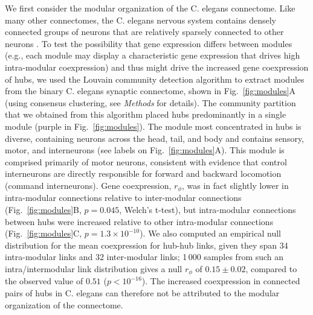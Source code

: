 \documentclass[10pt,letterpaper]{article}
\begin{document}
We first consider the modular organization of the C. elegans connectome.
Like many other connectomes, the C. elegans nervous system contains densely connected groups of neurons that are relatively sparsely connected to other neurons \cite{Kim2014, Bassett2010, Pavlovic2014}.
To test the possibility that gene expression differs between modules (e.g., each module may display a characteristic gene expression that drives high intra-modular coexpression) and thus might drive the increased gene coexpression of hubs, we used the Louvain community detection algorithm to extract modules from the binary C. elegans synaptic connectome, shown in Fig.~\ref{fig:modules}A (using consensus clustering, see \textit{Methods} for details).
The community partition that we obtained from this algorithm placed hubs predominantly in a single module (purple in Fig.~\ref{fig:modules}).
The module most concentrated in hubs is diverse, containing neurons across the head, tail, and body and contains sensory, motor, and interneurons (see labels on Fig.~\ref{fig:modules}A).
This module is comprised primarily of motor neurons, consistent with evidence that control interneurons are directly responsible for forward and backward locomotion (command interneurons).
Gene coexpression, $r_\phi$, was in fact slightly lower in intra-modular connections relative to inter-modular connections (Fig.~\ref{fig:modules}B, $p = 0.045$, Welch's t-test), but intra-modular connections between hubs were increased relative to other intra-modular connections (Fig.~\ref{fig:modules}C, $p = 1.3\times 10^{-10}$).
We also computed an empirical null distribution for the mean coexpression for hub-hub links, given they span 34 intra-modular links and 32 inter-modular links; 1\,000 samples from such an intra/intermodular link distribution gives a null $r_\phi$ of $0.15 \pm 0.02$, compared to the observed value of $0.51$ ($p < 10^{-16}$).
The increased coexpression in connected pairs of hubs in C. elegans can therefore not be attributed to the modular organization of the connectome.
\end{document}
